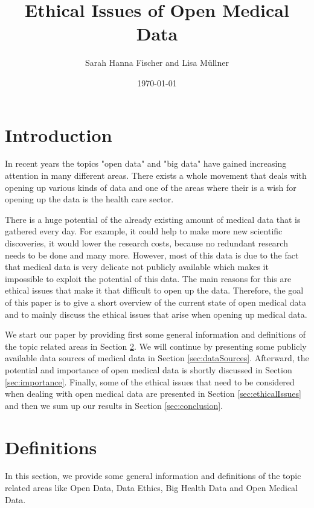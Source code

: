 \documentclass[a4paper, 11pt]{article}
\title{Ethical Issues of Open Medical Data}
\begin{document}
\date{\today}
\author{Sarah Hanna Fischer and Lisa Müllner}
\maketitle


\begin{abstract}
\end{abstract}

\section{Introduction} \label{sec:intro}
In recent years the topics "open data" and "big data" have gained increasing attention in many different areas. There exists a whole movement that deals with opening up various kinds of data and one of the areas where their is a wish for opening up the data is the health care sector. \cite{kitchin2014dataRevolution} 

There is a huge potential of the already existing amount of medical data that is gathered every day. For example, it could help to make more new scientific discoveries, it would lower the research costs, because no redundant research needs to be done and many more. However, most of this data is due to the fact that medical data is very delicate not publicly available which makes it impossible to exploit the potential of this data. The main reasons for this are ethical issues that make it that difficult to open up the data. Therefore, the goal of this paper is to give a short overview of the current state of open medical data and to mainly discuss the ethical issues that arise when opening up medical data. 

We start our paper by providing first some general information and definitions of the topic related areas in Section \ref{sec:definitions}. We will continue by presenting some publicly available data sources of medical data in Section \ref{sec:dataSources}. Afterward, the potential and importance of open medical data is shortly discussed in Section \ref{sec:importance}. Finally, some of the ethical issues that need to be considered when dealing with open medical data are presented in Section \ref{sec:ethicalIssues} and then we sum up our results in Section \ref{sec:conclusion}.

\section{Definitions}\label{sec:definitions}
In this section, we provide some general information and definitions of the topic related areas like Open Data, Data Ethics, Big Health Data and Open Medical Data. 
\end{document}
